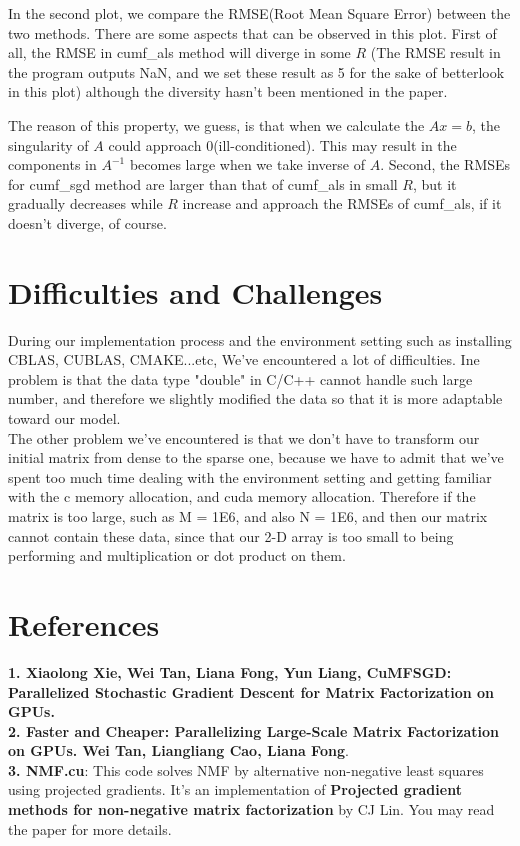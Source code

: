\documentclass[12pt]{article}
\theoremstyle{remark}
\begin{document}
\begin{CJK}{UTF8}{bsmi}
\begin{figure}[H]
\begin{center}
        \label{fig:arch_02}
    \end{center}
\end{figure}
In the second plot, we compare the RMSE(Root Mean Square Error) between the two methods.  There are some aspects that can be observed in this plot.  First of all, the RMSE in cumf\_als method will diverge in some $R$ (The RMSE result in the program outputs NaN, and we set these result as 5 for the sake of better\-look in this plot) although the diversity hasn’t been mentioned in the paper.

  The reason of this property, we guess, is that when we calculate the $Ax=b$, the singularity of $A$ could approach 0(ill-conditioned).  This may result in the components in $A^{-1}$ becomes large when we take inverse of $A$.  Second, the RMSEs for cumf\_sgd method are larger than that of cumf\_als in small $R$, but it gradually decreases while $R$ increase and approach the RMSEs of cumf\_als, if it doesn’t diverge, of course.
 \section{Difficulties and Challenges}
During our implementation process and the environment setting such as installing CBLAS, CUBLAS, CMAKE...etc, We've encountered a lot of difficulties. Ine problem is that the data type "double" in C/C++ cannot handle such large number, and therefore we slightly modified the data so that it is more adaptable toward our model.\\
The other problem we've encountered is that we don't have to transform our initial matrix from dense to the sparse one, because we have to admit that we've spent too much time dealing with the environment setting and getting familiar with the c memory allocation, and cuda memory allocation. Therefore if the matrix is too large, such as M = 1E6, and also N = 1E6, and then our matrix cannot contain these data, since that our 2-D array is too small to being performing and multiplication or dot product on them.
\section{References}
\textbf{1. Xiaolong Xie, Wei Tan, Liana Fong, Yun Liang, CuMFSGD: Parallelized Stochastic Gradient Descent for Matrix Factorization on GPUs.}
\\
\textbf{2. Faster and Cheaper: Parallelizing Large-Scale Matrix Factorization on GPUs. Wei Tan, Liangliang Cao, Liana Fong}.
\\
\textbf{3. NMF.cu}: This code solves NMF by alternative non-negative least squares using projected gradients. It's an implementation of \textbf{Projected gradient methods for non-negative matrix factorization} by CJ Lin. You may read the paper for more details.
\\

\end{CJK} 
\end{document}
